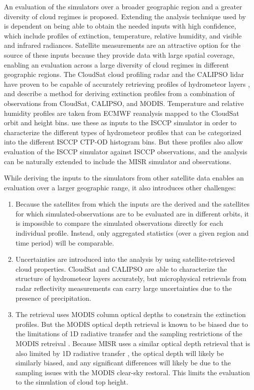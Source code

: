 \documentclass{article}
\begin{document}
An evaluation of the simulators over a broader geographic region and a greater diversity of cloud regimes is proposed. Extending the analysis technique used by \cite{mace_et_al_2010} is dependent on being able to obtain the needed inputs with high confidence, which include profiles of extinction, temperature, relative humidity, and visible and infrared radiances. Satellite measurements are an attractive option for the source of these inputs because they provide data with large spatial coverage, enabling an evaluation across a large diversity of cloud regimes in different geographic regions. The CloudSat cloud profiling radar \citep{stephens_et_al_2002} and the CALIPSO lidar \citep{winker_et_al_2007} have proven to be capable of accurately retrieving profiles of hydrometeor layers \cite{mace_et_al_2009}, and \cite{mace_and_wrenn_2013} describe a method for deriving extinction profiles from a combination of observations from CloudSat, CALIPSO, and MODIS. Temperature and relative humidity profiles are taken from ECMWF reanalysis mapped to the CloudSat orbit and height bins. \cite{mace_and_wrenn_2013} use these as inputs to the ISCCP simulator in order to characterize the different types of hydrometeor profiles that can be categorized into the different ISCCP CTP-OD histogram bins. But these profiles also allow evaluation of the ISCCP simulator against ISCCP observations, and the analysis can be naturally extended to include the MISR simulator and observations.

While deriving the inputs to the simulators from other satellite data enables an evaluation over a larger geographic range, it also introduces other challenges: 
\begin{enumerate}
\item Because the satellites from which the inputs are the derived and the satellites for which simulated-observations are to be evaluated are in different orbits, it is impossible to compare the simulated observations directly for each individual profile. Instead, only aggregated statistics (over a given region and time period) will be comparable. 

\item Uncertainties are introduced into the analysis by using satellite-retrieved cloud properties. CloudSat and CALIPSO are able to characterize the structure of hydrometeor layers accurately, but microphysical retrievals from radar reflectivity measurements can carry large uncertainties due to the presence of precipitation. 

\item The \cite{mace_and_wrenn_2013} retrieval uses MODIS column optical depths to constrain the extinction profiles. But the MODIS optical depth retrieval is known to be biased due to the limitations of 1D radiative transfer and the sampling restrictions of the MODIS retreival \citep{pincus_et_al_2012}. Because MISR uses a similar optical depth retrieval that is also limited by 1D radiative transfer \citep{marchand_et_al_2010}, the optical depth will likely be similarly biased, and any significant differences will likely be due to the sampling issues with the MODIS clear-sky restoral. This limits the evaluation to the simulation of cloud top height.
\end{enumerate}
\end{document}
